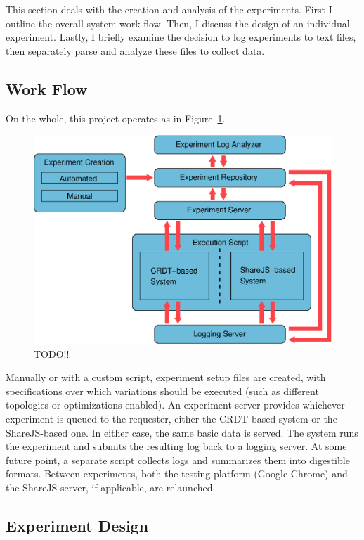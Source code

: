 \documentclass[12pt,a4paper,twoside,openright]{report}
\begin{document}
	This section deals with the creation and analysis of the experiments. First I outline the overall system work flow. Then, I discuss the design of an individual experiment. Lastly, I briefly examine the decision to log experiments to text files, then separately parse and analyze these files to collect data.

	\subsection{Work Flow}
	On the whole, this project operates as in Figure~\ref{fig:workflow}. 
	
	\begin{figure}[htb]
	\centering
	\includegraphics[width=1\linewidth]{figs/workflow.eps}
	\caption[Workflow]{ TODO!! }
	\label{fig:workflow}
	\end{figure}

	
	
	Manually or with a custom script, experiment setup files are created, with specifications over which variations should be executed (such as different topologies or optimizations enabled). An experiment server provides whichever experiment is queued to the requester, either the CRDT-based system or the ShareJS-based one. In either case, the same basic data is served. The system runs the experiment and submits the resulting log back to a logging server. At some future point, a separate script collects logs and summarizes them into digestible formats. Between experiments, both the testing platform (Google Chrome) and the ShareJS server, if applicable, are relaunched.

	\subsection{Experiment Design}
	
\end{document}
